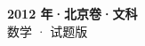 \documentclass[zihao=-4, a4paper]{ctexart}
\begin{document}
\begin{center}
  {\Large\bfseries 2012 年·北京卷·文科}\\[4pt]
  {\large 数学 · 试题版}
\end{center}
\medskip
{}

\end{document}
